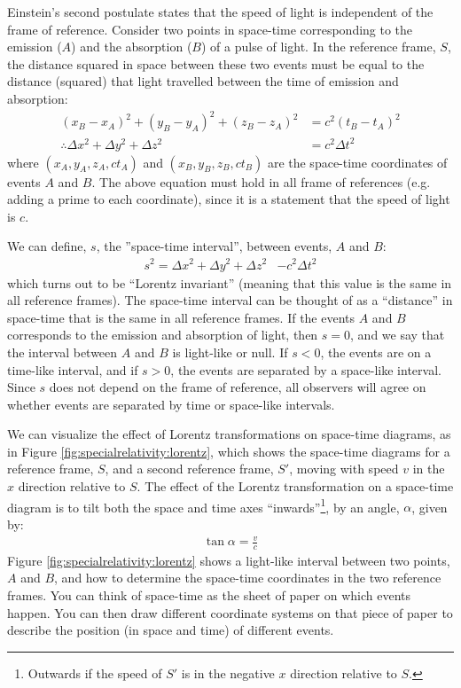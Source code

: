 Einstein's second postulate states that the speed of light is independent of the frame of reference. Consider two points in space-time corresponding to the emission ($A$) and the absorption ($B$) of a pulse of light. In the reference frame, $S$, the distance squared in space between these two events must be equal to the distance (squared) that light travelled between the time of emission and absorption:
\begin{align*}
(x_B-x_A)^2+(y_B-y_A)^2+(z_B-z_A)^2&= c^2(t_B-t_A)^2\\
\therefore \Delta x^2 + \Delta y^2 +\Delta z^2&=c^2\Delta t^2
\end{align*}
where $(x_A,y_A,z_A,ct_A)$ and $(x_B,y_B,z_B,ct_B)$ are the space-time coordinates of events $A$ and $B$. The above equation must hold in all frame of references (e.g. adding a prime to each coordinate), since it is a statement that the speed of light is $c$.

We can define, $s$, the ''space-time interval'', between events, $A$ and $B$:
\begin{align*}
s^2 = \Delta x^2 + \Delta y^2 +\Delta z^2&-c^2\Delta t^2
\end{align*}
which turns out to be ``Lorentz invariant'' (meaning that this value is the same in all reference frames). The space-time interval can be thought of as a ``distance'' in space-time that is the same in all reference frames. If the events $A$ and $B$ corresponds to the emission and absorption of light, then $s=0$, and we say that the interval between $A$ and $B$ is light-like or null. If $s<0$, the events are on a time-like interval, and if $s>0$, the events are separated by a space-like interval. Since $s$ does not depend on the frame of reference, all observers will agree on whether events are separated by time or space-like intervals.

We can visualize the effect of Lorentz transformations on space-time diagrams, as in Figure \ref{fig:specialrelativity:lorentz}, which shows the space-time diagrams for a reference frame, $S$, and a second reference frame, $S'$, moving with speed $v$ in the $x$ direction relative to $S$.
The effect of the Lorentz transformation on a space-time diagram is to tilt both the space and time axes ``inwards''\footnote{Outwards if the speed of $S'$ is in the negative $x$ direction relative to $S$.}, by an angle, $\alpha$, given by:
\begin{align*}
\tan\alpha = \frac{v}{c}
\end{align*}
Figure \ref{fig:specialrelativity:lorentz} shows a light-like interval between two points, $A$ and $B$, and how to determine the space-time coordinates in the two reference frames. You can think of space-time as the sheet of paper on which events happen. You can then draw different coordinate systems on that piece of paper to describe the position (in space and time) of different events.

